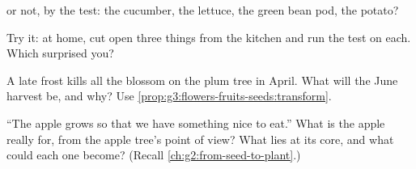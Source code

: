 \begin{exercise}[$\star$]\label{exo:g3:flowers-fruits-seeds:7}
 or not, by the  test: the cucumber, the lettuce, the
green bean pod, the potato?
\end{exercise}

\begin{exercise}[$\star$]\label{exo:g3:flowers-fruits-seeds:8}
Try it: at home, cut open three things from the kitchen and run
the  test on each. Which surprised you?
\end{exercise}

\begin{exercise}[$\star\star$]\label{exo:g3:flowers-fruits-seeds:9}
A late frost kills all the blossom on the plum tree in April.
What will the June harvest be, and why? Use
\cref{prop:g3:flowers-fruits-seeds:transform}.
\end{exercise}

\begin{exercise}[$\star\star$]\label{exo:g3:flowers-fruits-seeds:10}
``The apple grows so that we have something nice to eat.'' What
is the apple really for, from the apple tree's point of view?
What lies at its core, and what could each one become? (Recall
\cref{ch:g2:from-seed-to-plant}.)
\end{exercise}
